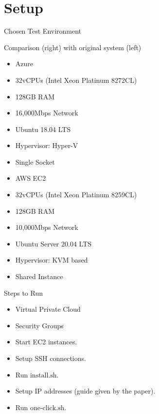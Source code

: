 \documentclass[xcolor=dvipsnames]{beamer}
\begin{document}
    

    \section{Setup}

    
    \begin{frame}{Chosen Test Environment}

        Comparison (right) with original system (left)
        \begin{multicols}{2}
            \begin{itemize}
                \item Azure
                \item 32vCPUs (Intel Xeon Platinum 8272CL) 
                \item 128GB RAM 
                \item 16,000Mbps Network
                \item Ubuntu 18.04 LTS
                \item Hypervisor: Hyper-V
                \item Single Socket
                \item AWS EC2
                \item 32vCPUs (Intel Xeon Platinum 8259CL) 
                \item 128GB RAM
                \item 10,000Mbps Network 
                \item Ubuntu Server 20.04 LTS
                \item Hypervisor: KVM based
                \item Shared Instance
            \end{itemize}      
        \end{multicols}
    \end{frame}


    \begin{frame}{Steps to Run}

        \begin{itemize}
            \item Virtual Private Cloud 
            \item Security Groups 
            \item Start EC2 instances.
            \item Setup SSH connections. 
            \item Run $\text{install}.\text{sh}$.
            \item Setup IP addresses (guide given by the paper).
            \item Run $\text{one-click}.\text{sh}$.
        \end{itemize}

    \end{frame}
\end{document}
